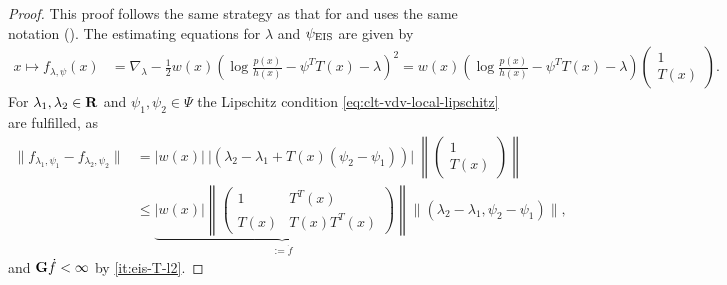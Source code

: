 \begin{proof}
    This proof follows the same strategy as that for  and uses the same notation (). 
    The estimating equations for $\lambda$ and ${\psi_{\text{EIS}}}$ are given by 
    \begin{align*}
    x \mapsto f_{\lambda,\psi}(x) &= \nabla_{\lambda} -\frac{1}{2}w(x)\left(\log \frac{p(x)}{h(x)} - \psi^{T}T(x) -\lambda \right)^{2} = w(x) \left( \log \frac{p(x)}{h(x)} - \psi^{T}T(x) -\lambda  \right)\begin{pmatrix}
        1 \\ T(x)
    \end{pmatrix}.
    \end{align*}
    For $\lambda_{1}, \lambda_{2}\in\mathbf R$ and $\psi_{1}, \psi_{2}\in\Psi$ the Lipschitz condition \cref{eq:clt-vdv-local-lipschitz} are fulfilled, as 
    \begin{align*}
    \lVert f_{\lambda_{1}, \psi_{1}} - f_{\lambda_{2}, \psi_{2}} \rVert &= \lvert w(x) \rvert ~\lvert \left( \lambda_{2} - \lambda_{1} + T(x) \left( \psi_{2} - \psi_{1} \right) \right)\rvert ~\left\lVert \begin{pmatrix}
        1 \\ T(x)
    \end{pmatrix} \right\rVert \\
        &\leq \underbrace{\lvert w(x) \rvert \left\lVert \begin{pmatrix} 1 & T^{T}(x) \\ T(x) & T(x) T^T(x) \end{pmatrix} \right\rVert}_{:=\dot f} \lVert \left( \lambda_{2} - \lambda_{1}, \psi_{2} - \psi_{1} \right)\rVert,
    \end{align*}
    and $\mathbf G \dot f < \infty$ by \ref{it:eis-T-l2}.


\end{proof}
